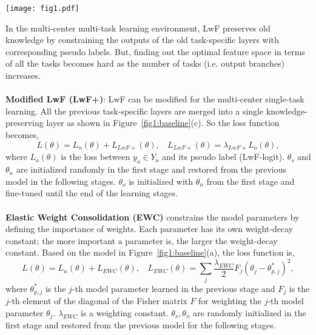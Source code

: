 \documentclass[runningheads,a4paper]{llncs}
\begin{document}
\begin{figure*}[t]
\begin{center}
\texttt{[image: fig1.pdf]}
\caption{Model architectures: (a) FT/EWC, (b) LwF, and (c) modified LwF (LwF+).}
\label{fig1:baseline}
\end{center}
\end{figure*}

In the multi-center multi-task learning environment, LwF preserves old knowledge by constraining the outputs of the old task-specific layers with corresponding pseudo labels. But, finding out the optimal feature space in terms of all the tasks becomes hard as the number of tasks (i.e. output branches) increases. 
\\\\
\noindent\textbf{Modified LwF (LwF+)}: LwF can be modified for the multi-center single-task learning. All the previous task-specific layers are merged into a single knowledge-preserving layer as shown in Figure~\ref{fig1:baseline}(c). So the loss function becomes,
\begin{equation} \label{eq2_lwf+}
	L(\theta) = L_n(\theta) + L_{LwF+}(\theta), ~~~~ L_{LwF+}(\theta) = \lambda_{LwF+} L_{o}(\theta),
\end{equation}
\noindent where $L_{o}(\theta)$ is the loss between $y_o \in Y_o$ and its pseudo label (LwF-logit). $\theta_s$ and $\theta_n$ are initialized randomly in the first stage and restored from the previous model in the following stages. $\theta_o$ is initialized with $\theta_n$ from the first stage and fine-tuned until the end of the learning stages.
\\\\
\noindent\textbf{Elastic Weight Consolidation (EWC)} constrains the model parameters by defining the importance of weights. Each parameter has its own weight-decay constant; the more important a parameter is, the larger the weight-decay constant. Based on the model in Figure~\ref{fig1:baseline}(a), the loss function is,
\begin{equation} \label{eq3_ewc}
	L(\theta) = L_n(\theta) + L_{EWC}(\theta), ~~~~ L_{EWC}(\theta) = \sum_j \frac{\lambda_{EWC}}{2} F_j(\theta_j - \theta_{p,j}^*)^2,
\end{equation}
\noindent where $\theta_{p,j}^*$ is the $j$-th model parameter learned in the previous stage and $F_j$ is the $j$-th element of the diagonal of the Fisher matrix $F$ for weighting the $j$-th model parameter $\theta_j$. $\lambda_{EWC}$ is a weighting constant. $\theta_s, \theta_n$ are randomly initialized in the first stage and restored from the previous model for the following stages.
\end{document}
